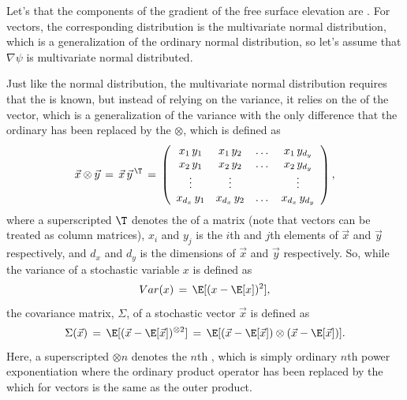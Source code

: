 Let's \assume that the components of the gradient of the free surface elevation are . For vectors, the corresponding distribution is the multivariate normal distribution, which is a generalization of the ordinary normal distribution, so let's assume that $\nabla\psi$ is multivariate normal distributed.

Just like the normal distribution, the multivariate normal distribution requires that the \mean is known, but instead of relying on the variance, it relies on the  of the vector, which is a generalization of the variance with the only difference that the ordinary  has been replaced by the  $\otimes$, which is defined as
%
\begin{equation} \label{eq:outer_product_definition}
\vec{x}\otimes\vec{y} \,=\, \vec{x}\,\vec{y}^{\,\T} \,=\,
\left(\begin{array}{cccc}
x_1    \,y_1 & x_1    \,y_2 & \dots & x_1    \,y_{d_y} \\
x_2    \,y_1 & x_2    \,y_2 & \dots & x_2    \,y_{d_y} \\
\vdots       & \vdots       &       & \vdots           \\
x_{d_x}\,y_1 & x_{d_x}\,y_2 & \dots & x_{d_x}\,y_{d_y}
\end{array}\right),
\end{equation}
%
where a superscripted $\T$ denotes the \transpose of a matrix (note that vectors can be treated as column matrices), $x_i$ and $y_j$ is the $i$th and $j$th elements of $\vec{x}$ and $\vec{y}$ respectively, and $d_x$ and $d_y$ is the dimensions of $\vec{x}$ and $\vec{y}$ respectively. So, while the variance of a stochastic variable $x$ is defined as
%
\begin{equation} \label{eq:variance_definition}
Var(x) \,=\, \E[(x - \E[x])^2],
\end{equation}
%
the covariance matrix, $\Sigma$, of a stochastic vector $\vec{x}$ is defined as
%
\begin{equation} \label{eq:covariance_matrix_definition}
\Sigma(\vec{x}) \,=\, \E[(\vec{x} - \E[\vec{x}])^{\otimes 2}] \,=\, \E[(\vec{x} - \E[\vec{x}])\otimes(\vec{x} - \E[\vec{x}])].
\end{equation}
%
Here, a superscripted $\otimes n$ denotes the $n$th , which is simply ordinary $n$th power exponentiation where the ordinary product operator has been replaced by the  which for vectors is the same as the outer product.

